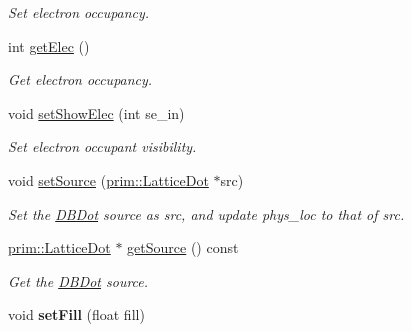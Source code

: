 \begin{DoxyCompactItemize}
\begin{DoxyCompactList}\small\item\em Set electron occupancy. \end{DoxyCompactList}\item 
int \hyperlink{classprim_1_1DBDot_a0cf330485eab096e564495d7420213bc}{get\+Elec} ()\hypertarget{classprim_1_1DBDot_a0cf330485eab096e564495d7420213bc}{}\label{classprim_1_1DBDot_a0cf330485eab096e564495d7420213bc}

\begin{DoxyCompactList}\small\item\em Get electron occupancy. \end{DoxyCompactList}\item 
void \hyperlink{classprim_1_1DBDot_a1ae039b78cafd8ee28b1f8f064b59b77}{set\+Show\+Elec} (int se\+\_\+in)\hypertarget{classprim_1_1DBDot_a1ae039b78cafd8ee28b1f8f064b59b77}{}\label{classprim_1_1DBDot_a1ae039b78cafd8ee28b1f8f064b59b77}

\begin{DoxyCompactList}\small\item\em Set electron occupant visibility. \end{DoxyCompactList}\item 
void \hyperlink{classprim_1_1DBDot_a7eaa80cc7a9eef5f1b5d866393cf5071}{set\+Source} (\hyperlink{classprim_1_1LatticeDot}{prim\+::\+Lattice\+Dot} $\ast$src)\hypertarget{classprim_1_1DBDot_a7eaa80cc7a9eef5f1b5d866393cf5071}{}\label{classprim_1_1DBDot_a7eaa80cc7a9eef5f1b5d866393cf5071}

\begin{DoxyCompactList}\small\item\em Set the \hyperlink{classprim_1_1DBDot}{D\+B\+Dot} source as src, and update phys\+\_\+loc to that of src. \end{DoxyCompactList}\item 
\hyperlink{classprim_1_1LatticeDot}{prim\+::\+Lattice\+Dot} $\ast$ \hyperlink{classprim_1_1DBDot_ac9a25ede31a8741b560f2f977c26f58d}{get\+Source} () const \hypertarget{classprim_1_1DBDot_ac9a25ede31a8741b560f2f977c26f58d}{}\label{classprim_1_1DBDot_ac9a25ede31a8741b560f2f977c26f58d}

\begin{DoxyCompactList}\small\item\em Get the \hyperlink{classprim_1_1DBDot}{D\+B\+Dot} source. \end{DoxyCompactList}\item 
void {\bfseries set\+Fill} (float fill)\hypertarget{classprim_1_1DBDot_a4f87ecc0589fa5eb3c7065e776b63477}{}\label{classprim_1_1DBDot_a4f87ecc0589fa5eb3c7065e776b63477}


\end{DoxyCompactItemize}
